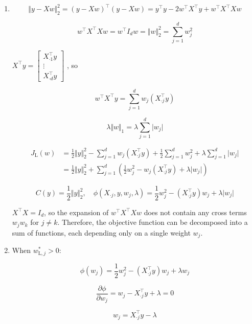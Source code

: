 \documentclass[11pt]{article}
\begin{document}
\begin{enumerate}

    \item[1. ]
    
    $$
    \Vert y - Xw \Vert _2^2 = (y - Xw)^\top (y - Xw) = y^\top y - 2w^\top X^\top y + w^\top X^\top X w
    $$

    $$
    w^\top X^\top X w = w^\top I_d w = \Vert w \Vert _2^2 = \sum_{j=1}^d w_j^2
    $$

    $X^\top y
    =
    \begin{bmatrix}
        X_{\cdot 1}^\top y \\
        \vdots \\
        X_{\cdot d}^\top y
    \end{bmatrix}$
    , so

    $$
    w^\top X^\top y = \sum_{j=1}^d w_j (X_{\cdot j}^\top y)
    $$

    $$
    \lambda \Vert w \Vert_1 = \lambda \sum_{j=1}^d \vert w_j \vert
    $$

    $$
    \begin{aligned}
    J_{\text{L}}(w)
    &= \frac{1}{2}\Vert y \Vert _2^2 - \sum_{j=1}^d w_j (X_{\cdot j}^\top y) + \frac{1}{2}\sum_{j=1}^d w_j^2 + \lambda \sum_{j=1}^d \vert w_j \vert \\
    &= \frac{1}{2}\Vert y \Vert _2^2 + \sum_{j=1}^d \left( \frac{1}{2} w_j^2 - w_j (X_{\cdot j}^\top y) + \lambda \vert w_j \vert \right)
    \end{aligned}
    $$

    $$
    C(y) = \frac{1}{2}\Vert y \Vert _2^2
    ,\quad
    \phi(X_{\cdot j}, y, w_j, \lambda) = \frac{1}{2} w_j^2 - (X_{\cdot j}^\top y) w_j + \lambda \vert w_j \vert
    $$

    $X^\top X = I_d$, so the expansion of $w^\top X^\top X w$ does not contain any cross terms $w_j w_k$ for $j \neq k$. Therefore, the objective function can be decomposed into a sum of functions, each depending only on a single weight $w_j$.

    \item[2. ]

    When $w_{\text{L}, j}^* > 0$:

    $$
    \phi(w_j) = \frac{1}{2}w_j^2 - (X_{\cdot j}^\top y) w_j + \lambda w_j
    $$

    $$
    \frac{\partial \phi}{\partial w_j} = w_j - X_{\cdot j}^\top y + \lambda = 0
    $$

    $$
    w_j = X_{\cdot j}^\top y - \lambda
    $$


\end{enumerate}
\end{document}
